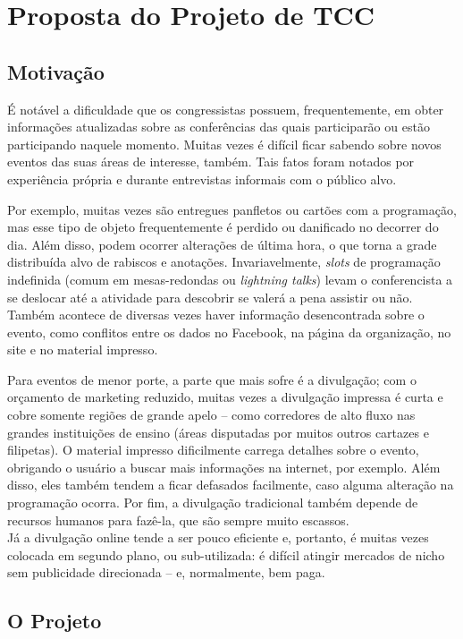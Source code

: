 \documentclass[12pt,a4paper,twoside,hyphens,english,brazil]{abntex2}
\begin{document}
\chapter{Proposta do Projeto de TCC}

\section{Motivação}

É notável a dificuldade que os congressistas possuem, frequentemente, em obter informações atualizadas sobre as conferências das quais participarão ou estão participando naquele momento. Muitas vezes é difícil ficar sabendo sobre novos eventos das suas áreas de interesse, também. Tais fatos foram notados por experiência própria e durante entrevistas informais com o público alvo.

Por exemplo, muitas vezes são entregues panfletos ou cartões com a programação, mas esse tipo de objeto frequentemente é perdido ou danificado no decorrer do dia. Além disso, podem ocorrer alterações de última hora, o que torna a grade distribuída alvo de rabiscos e anotações. Invariavelmente, \emph{slots} de programação indefinida (comum em mesas-redondas ou \emph{lightning talks}\footnotemark) levam o conferencista a se deslocar até a atividade para descobrir se valerá a pena assistir ou não. Também acontece de diversas vezes haver informação desencontrada sobre o evento, como conflitos entre os dados no Facebook, na página da organização, no site e no material impresso.

Para eventos de menor porte, a parte que mais sofre é a divulgação; com o orçamento de marketing reduzido, muitas vezes a divulgação impressa é curta e cobre somente regiões de grande apelo -- como corredores de alto fluxo nas grandes instituições de ensino (áreas disputadas por muitos outros cartazes e filipetas). O material impresso dificilmente carrega detalhes sobre o evento, obrigando o usuário a buscar mais informações na internet, por exemplo. Além disso, eles também tendem a ficar defasados facilmente, caso alguma alteração na programação ocorra. Por fim, a divulgação tradicional também depende de recursos humanos para fazê-la, que são sempre muito escassos.\\
Já a divulgação online tende a ser pouco eficiente e, portanto, é muitas vezes colocada em segundo plano, ou sub-utilizada: é difícil atingir mercados de nicho sem publicidade direcionada -- e, normalmente, bem paga.

\section{O Projeto}
\end{document}
